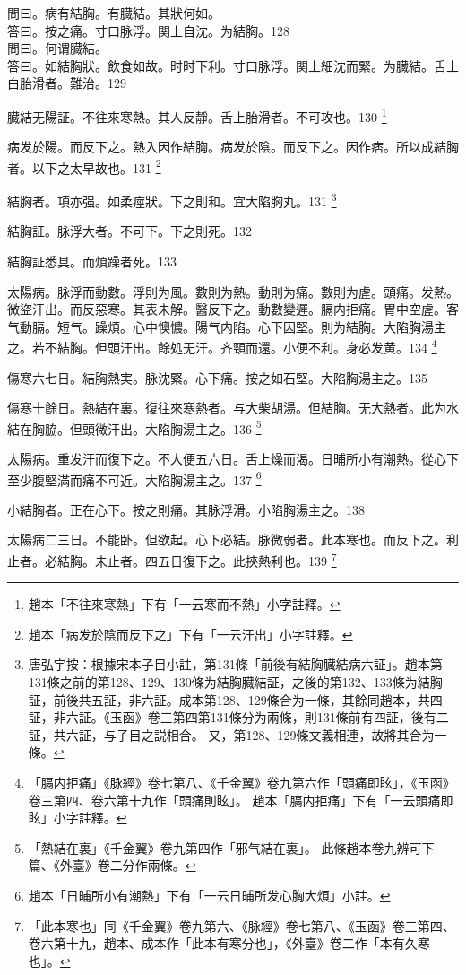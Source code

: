 問曰。病有結胸。有臓結。其狀何如。\\
答曰。按之痛。寸口脉浮。関上自沈。为結胸。128\\
問曰。何谓臓結。\\
答曰。如結胸狀。飲食如故。时时下利。寸口脉浮。関上細沈而緊。为臓結。舌上白胎滑者。難治。129

臓結无陽証。不往來寒熱。其人反靜。舌上胎滑者。不可攻也。130
	\footnote{
		趙本「不往來寒熱」下有「一云寒而不熱」小字註釋。
	}

病发於陽。而反下之。熱入因作結胸。病发於陰。而反下之。因作痞。所以成結胸者。以下之太早故也。131
	\footnote{
		趙本「病发於陰而反下之」下有「一云汗出」小字註釋。
	}

結胸者。項亦强。如柔痙狀。下之則和。宜大陷胸丸。131
	\footnote{
		唐弘宇按：根據宋本子目小註，第131條「前後有結胸臓結病六証」。趙本第131條之前的第128、129、130條为結胸臓結証，之後的第132、133條为結胸証，前後共五証，非六証。成本第128、129條合为一條，其餘同趙本，共四証，非六証。《玉函》卷三第四第131條分为兩條，則131條前有四証，後有二証，共六証，与子目之説相合。
		又，第128、129條文義相連，故將其合为一條。
	}

結胸証。脉浮大者。不可下。下之則死。132

結胸証悉具。而煩躁者死。133

太陽病。脉浮而動數。浮則为風。數則为熱。動則为痛。數則为虗。頭痛。发熱。微盜汗出。而反惡寒。其表未解。醫反下之。動數變遲。膈内拒痛。胃中空虗。客气動膈。短气。躁煩。心中懊憹。陽气内陷。心下因堅。則为結胸。大陷胸湯主之。若不結胸。但頭汗出。餘処无汗。齐頸而還。小便不利。身必发黄。134
	\footnote{
		「膈内拒痛」《脉經》卷七第八、《千金翼》卷九第六作「頭痛即眩」，《玉函》卷三第四、卷六第十九作「頭痛則眩」。
		趙本「膈内拒痛」下有「一云頭痛即眩」小字註釋。
	}

傷寒六七日。結胸熱実。脉沈緊。心下痛。按之如石堅。大陷胸湯主之。135

傷寒十餘日。熱結在裏。復往來寒熱者。与大柴胡湯。但結胸。无大熱者。此为水結在胸脇。{\khaai 但}頭微汗出。大陷胸湯主之。136
	\footnote{
		「熱結在裏」《千金翼》卷九第四作「邪气結在裏」。
		此條趙本卷九辨可下篇、《外臺》卷二分作兩條。
	}

太陽病。重发汗而復下之。不大便五六日。舌上燥而渴。日晡所小有潮熱。從心下至少腹堅滿而痛不可近。大陷胸湯主之。137
	\footnote{
		趙本「日晡所小有潮熱」下有「一云日晡所发心胸大煩」小註。
	}

小結胸者。正在心下。按之則痛。其脉浮滑。小陷胸湯主之。138

太陽病二三日。不能卧。但欲起。心下必結。脉微弱者。此本寒也。而反下之。利止者。必結胸。未止者。四五日復下之。此挾熱利也。139
	\footnote{
		「此本寒也」同《千金翼》卷九第六、《脉經》卷七第八、《玉函》卷三第四、卷六第十九，趙本、成本作「此本有寒分也」，《外臺》卷二作「本有久寒也」。
	}

